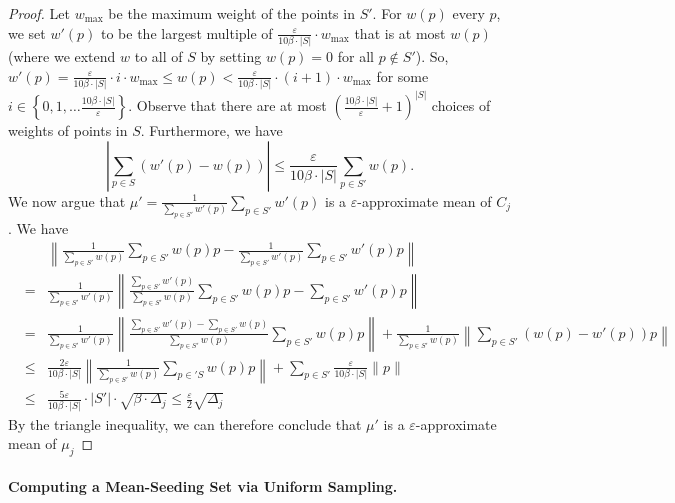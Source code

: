 \documentclass[11pt]{article}
\begin{document}
\begin{proof}
Let $w_{\max}$ be the maximum weight of the points in $S'$. For $w(p)$ every $p$, we set $w'(p)$ to be the largest multiple of $\frac{\varepsilon}{10\beta\cdot |S|}\cdot w_{\max}$ that is
at most $w(p)$ (where we extend $w$ to all of $S$ by setting $w(p)=0$ for all $p\not\in S'$). So,
$w'(p) = \frac{\varepsilon}{10\beta\cdot |S|}\cdot i \cdot w_{\max} \leq w(p)< \frac{\varepsilon}{10\beta\cdot |S|}\cdot (i+1) \cdot w_{\max} $ for some $i\in \left\{0,1,\ldots \frac{10\beta\cdot |S|}{\varepsilon}\right\}$. Observe that there are at most $\left(\frac{10\beta\cdot |S|}{\varepsilon}+1\right)^{|S|}$
choices of weights of points in $S$.
Furthermore, we have
$$
\left\vert\sum_{p\in S}\left(w'(p)-w(p)\right)\right\vert \leq \frac{\varepsilon}{10\beta\cdot |S|}\sum_{p\in S'}w(p).
$$
We now argue that $\mu' = \frac{1}{\sum_{p\in S'}w'(p)}\sum_{p\in S'} w'(p)$ is a $\varepsilon$-approximate mean of $C_j$.
We have
\begin{eqnarray*}
    & & \left\|\frac{1}{\sum_{p\in S'}w(p)}\sum_{p\in S'}w(p)p - \frac{1}{\sum_{p\in S'}w'(p)}\sum_{p\in S'}w'(p)p\right\| \\
    &=& \frac{1}{\sum_{p\in S'}w'(p)}\left\|\frac{\sum_{p\in S'}w'(p)}{\sum_{p\in S'}w(p)}\sum_{p\in S'}w(p)p - \sum_{p\in S'}w'(p)p\right\| \\
    &=& \frac{1}{\sum_{p\in S'}w'(p)}\left\|\frac{\sum_{p\in S'}w'(p)-\sum_{p\in S'}w(p)}{\sum_{p\in S'}w(p)}\sum_{p\in S'}w(p)p\right\| + \frac{1}{\sum_{p\in S'}w(p)}\left\|\sum_{p\in S'}(w(p)-w'(p))p\right\|\\
    &\leq & \frac{2\varepsilon}{10\beta\cdot |S|}\left\|\frac{1}{\sum_{p\in S'}w(p)}\sum_{p\in 'S}w(p)p\right\| + \sum_{p\in S'} \frac{\varepsilon}{10\beta\cdot |S|}\|p\| \\
    &\leq & \frac{5\varepsilon}{10\beta\cdot |S|} \cdot |S'| \cdot \sqrt{\beta\cdot \Delta_j} \leq \frac{\varepsilon}{2} \sqrt{\Delta_j}
\end{eqnarray*}
By the triangle inequality, we can therefore conclude that $\mu'$ is a $\varepsilon$-approximate mean of $\mu_j$
\end{proof}



\paragraph{Computing a Mean-Seeding Set via Uniform Sampling.}
\end{document}
